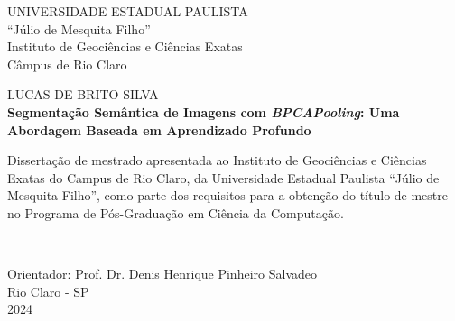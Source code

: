 \newpage
\thispagestyle{empty}

\begin{center}
    UNIVERSIDADE ESTADUAL PAULISTA\\
    “Júlio de Mesquita Filho”\\
    Instituto de Geociências e Ciências Exatas\\
    Câmpus de Rio Claro
    
    \vspace{2cm}
    {LUCAS DE BRITO SILVA\\}
    \vspace{2cm}
    \textbf{Segmentação Semântica de Imagens com \textit{BPCAPooling}: Uma Abordagem Baseada em Aprendizado Profundo}
    
    \vspace{4cm}
    
    \hspace{.45\linewidth}
    \begin{minipage}{.50\linewidth}
    \small
        Dissertação de mestrado apresentada ao Instituto de Geociências e Ciências Exatas do Campus de Rio Claro, da Universidade Estadual Paulista ``Júlio de Mesquita Filho'', como parte dos requisitos para a obtenção do título de mestre no Programa de Pós-Graduação em Ciência da Computação.
    \end{minipage} \\
    
    \vspace{1cm}

    Orientador: Prof. Dr. Denis Henrique Pinheiro Salvadeo\\
    
    \vfill
    \normalsize
    Rio Claro - SP \\
    2024
\end{center}